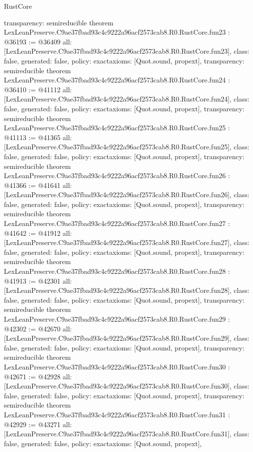 \begin{lexlean}{RustCore}
\begin{coremodule}
{  transparency: semireducible
}
theorem LexLeanPreserve.C9ae37fbad93c4c9222a96acf2573cab8.R0.RustCore.fun23 : @36193 := @36409 {
  all: [LexLeanPreserve.C9ae37fbad93c4c9222a96acf2573cab8.R0.RustCore.fun23],
  class: false,
  generated: false,
  policy: exact{axioms: [Quot.sound, propext]},
  transparency: semireducible
}
theorem LexLeanPreserve.C9ae37fbad93c4c9222a96acf2573cab8.R0.RustCore.fun24 : @36410 := @41112 {
  all: [LexLeanPreserve.C9ae37fbad93c4c9222a96acf2573cab8.R0.RustCore.fun24],
  class: false,
  generated: false,
  policy: exact{axioms: [Quot.sound, propext]},
  transparency: semireducible
}
theorem LexLeanPreserve.C9ae37fbad93c4c9222a96acf2573cab8.R0.RustCore.fun25 : @41113 := @41365 {
  all: [LexLeanPreserve.C9ae37fbad93c4c9222a96acf2573cab8.R0.RustCore.fun25],
  class: false,
  generated: false,
  policy: exact{axioms: [Quot.sound, propext]},
  transparency: semireducible
}
theorem LexLeanPreserve.C9ae37fbad93c4c9222a96acf2573cab8.R0.RustCore.fun26 : @41366 := @41641 {
  all: [LexLeanPreserve.C9ae37fbad93c4c9222a96acf2573cab8.R0.RustCore.fun26],
  class: false,
  generated: false,
  policy: exact{axioms: [Quot.sound, propext]},
  transparency: semireducible
}
theorem LexLeanPreserve.C9ae37fbad93c4c9222a96acf2573cab8.R0.RustCore.fun27 : @41642 := @41912 {
  all: [LexLeanPreserve.C9ae37fbad93c4c9222a96acf2573cab8.R0.RustCore.fun27],
  class: false,
  generated: false,
  policy: exact{axioms: [Quot.sound, propext]},
  transparency: semireducible
}
theorem LexLeanPreserve.C9ae37fbad93c4c9222a96acf2573cab8.R0.RustCore.fun28 : @41913 := @42301 {
  all: [LexLeanPreserve.C9ae37fbad93c4c9222a96acf2573cab8.R0.RustCore.fun28],
  class: false,
  generated: false,
  policy: exact{axioms: [Quot.sound, propext]},
  transparency: semireducible
}
theorem LexLeanPreserve.C9ae37fbad93c4c9222a96acf2573cab8.R0.RustCore.fun29 : @42302 := @42670 {
  all: [LexLeanPreserve.C9ae37fbad93c4c9222a96acf2573cab8.R0.RustCore.fun29],
  class: false,
  generated: false,
  policy: exact{axioms: [Quot.sound, propext]},
  transparency: semireducible
}
theorem LexLeanPreserve.C9ae37fbad93c4c9222a96acf2573cab8.R0.RustCore.fun30 : @42671 := @42928 {
  all: [LexLeanPreserve.C9ae37fbad93c4c9222a96acf2573cab8.R0.RustCore.fun30],
  class: false,
  generated: false,
  policy: exact{axioms: [Quot.sound, propext]},
  transparency: semireducible
}
theorem LexLeanPreserve.C9ae37fbad93c4c9222a96acf2573cab8.R0.RustCore.fun31 : @42929 := @43271 {
  all: [LexLeanPreserve.C9ae37fbad93c4c9222a96acf2573cab8.R0.RustCore.fun31],
  class: false,
  generated: false,
  policy: exact{axioms: [Quot.sound, propext]},
}
\end{coremodule}
\end{lexlean}
